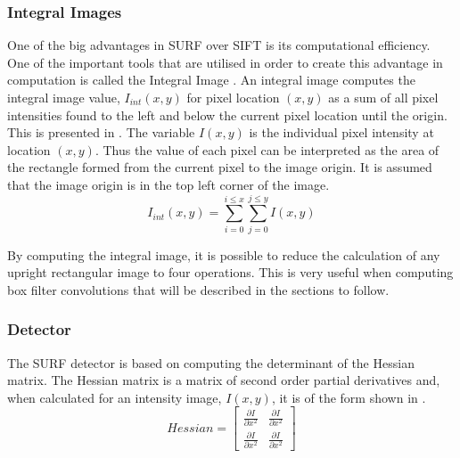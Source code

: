 \documentclass{report}
\begin{document}
\subsubsection{Integral Images}
\label{sec:integralImages}
One of the big advantages in SURF over SIFT \cite{Lowe2004} is its computational efficiency. One of the important tools that are utilised in order to create this advantage in computation is called the Integral Image \cite{Bay2008}. An integral image computes the integral image value, $I_{int}(x,y)$ for pixel location $(x,y)$  as a sum of all pixel intensities found to the left and below the current pixel location until the origin. This is presented in . The variable $I(x,y)$ is the individual pixel intensity at location $(x,y)$. Thus the value of each pixel can be interpreted as the area of the rectangle formed from the current pixel to the image origin. It is assumed that the image origin is in the top left corner of the image. \\

\begin{equation}
I_{int}(x,y) = \sum_{i=0}^{i \leq x}\sum_{j=0}^{j \leq y}I(x,y)
\label{eqn:integralImage}
\end{equation}

By computing the integral image, it is possible to reduce the calculation of any upright rectangular image to four operations. This is very useful when computing box filter convolutions that will be described in the sections to follow.\\

\subsubsection{Detector}
\label{2dsurfdetect}
The SURF detector is based on computing the determinant of the Hessian matrix. The Hessian matrix is a matrix of second order partial derivatives and, when calculated for an intensity image,  $I(x,y)$, it is of the form shown in .\\

\begin{equation}
Hessian = \left[ \begin{array}{cc} \frac{\partial I}{\partial x^2} & \frac{\partial I}{\partial x^2}\\
					    \frac{\partial I}{\partial x^2} & \frac{\partial I}{\partial x^2}\end{array} \right]
\label{eqn:hessian}
\end{equation}
\end{document}
